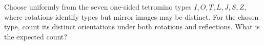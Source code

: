 Choose uniformly from the seven one-sided tetromino types $I,O,T,L,J,S,Z$, where rotations identify types but mirror images may be distinct. For the chosen type, count its distinct orientations under both rotations and reflections. What is the expected count?
